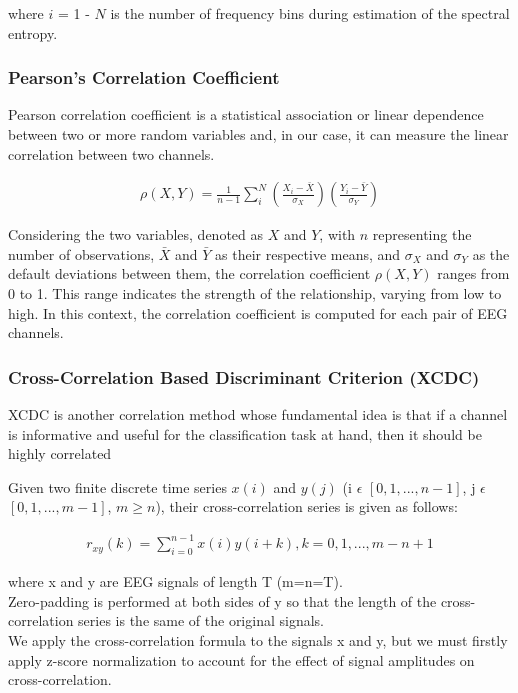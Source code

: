 \documentclass{Configuration_Files/PoliMi3i_thesis}
\begin{document}
where $i$ = 1 - $N$ is the number of frequency bins during estimation of the spectral entropy.

\subsubsection{Pearson’s Correlation Coefficient }

Pearson correlation coefficient is a statistical association or linear dependence between two or more random variables and, in our case, it can measure the linear correlation between two channels. \cite{thibeaultUsingHybridNeuron2013}


\begin{align}
	\rho (X,Y) = \frac{1}{n-1} \sum_{i}^{N}(\frac{X_i - \bar{X}}{\sigma_{X}})( \frac{Y_i - \bar{Y}}{\sigma_{Y}})
	\label{eq:correlationCoefficient}
\end{align}

Considering the two variables, denoted as \( X \) and \( Y \), with \( n \) representing the number of observations, \( \bar{X} \) and \( \bar{Y} \) as their respective means, and \( \sigma_X \) and \( \sigma_Y \) as the default deviations between them, the correlation coefficient \( \rho(X,Y) \) ranges from 0 to 1. This range indicates the strength of the relationship, varying from low to high. In this context, the correlation coefficient is computed for each pair of EEG channels.

\subsubsection{Cross-Correlation Based Discriminant Criterion (XCDC)}

XCDC is another correlation method whose fundamental idea is that if a channel is informative and useful for the classification task at hand, then it should be highly correlated 


Given two finite discrete time series $x(i)$ and $y(j)$
(i $\epsilon$ $[0, 1, . . . , n - 1]$, j $\epsilon$ $[0, 1, . . . , m - 1]$, $m \geq n$),
their cross-correlation series is given as follows:

\begin{align}
	 r_{xy}(k) = \sum_{i=0}^{n-1}x(i)y(i + k), k = 0,1,...,m-n+1
	\label{eq:XCDC1}
\end{align}

where x and y are EEG signals of length T (m=n=T). \\ 
Zero-padding is performed at both sides of y so that the length of the cross-correlation series is the same of the original signals. \\
We apply the cross-correlation formula to the signals x and y, but we must firstly apply z-score normalization to account for the effect of signal amplitudes on cross-correlation.
\end{document}

